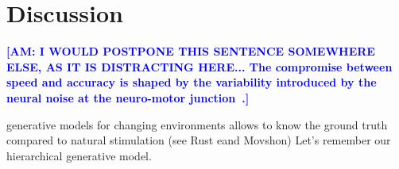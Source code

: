 \documentclass[12pt,english]{article}%
\newcommand{\citep}[1]{\parencite{#1}}
\newcommand{\citet}[1]{\textcite{#1}}
\newcommand{\AM}[1]{\textbf{\textcolor{blue}{[AM: #1]}}}
\begin{document}
\section{Discussion}
\label{sec:outro}

%

\AM{I WOULD POSTPONE THIS SENTENCE SOMEWHERE ELSE, AS IT IS DISTRACTING HERE... The compromise between speed and accuracy is shaped
by the variability introduced by the neural noise
at the neuro-motor junction~\citep{Harris98}.}



%

generative models for changing environments allows to know the ground truth compared to natural stimulation (see Rust eand Movshon)%
Let's remember our hierarchical generative model.
\end{document}
